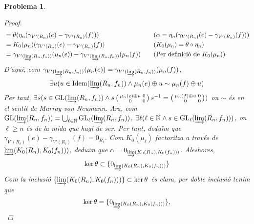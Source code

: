 \documentclass[compress]{article}
\newtheorem{problema}{Problema}
\theoremstyle{definition}
\DeclareMathOperator{\Idem}{Idem}
\DeclareMathOperator{\GL}{GL}
\begin{document}
\begin{problema}
\begin{enumerate}
\begin{proof}
\begin{align*}
                &=\theta(\eta_{n}(\gamma_{V'(R_{n})}(e)-\gamma_{V'(R_{n})}(f)))
                &\quad&\textrm{($\alpha=\eta_{n}(\gamma_{V'(R_{n})}(e)-\gamma_{V'(R_{n})}(f))$)}\\
                &=K_{0}(\mu_{n})(\gamma_{V'(R_{n})}(e)-\gamma_{V'(R_{n})}(f))
                &\quad&\textrm{($K_{0}(\mu_{n})=\theta\circ\eta_{n}$)}\\
                &=\gamma_{V'(\varinjlim(R_{n},f_{n}))}(\mu_{n}(e))-\gamma_{V'(\varinjlim(R_{n},f_{n}))}(\mu_{n}(f))
                &\quad&\textrm{(Per definició de $K_{0}(\mu_{n})$)}
            \end{align*}
            D'aquí, com $\gamma_{V'(\varinjlim(R_{n},f_{n}))}(\mu_{n}(e))=\gamma_{V'(\varinjlim(R_{n},f_{n}))}(\mu_{n}(f))$,
            \begin{equation*}
                \exists u(u\in\Idem(\varinjlim(R_{n},f_{n}))\land\mu_{n}(e)\oplus u\sim\mu_{n}(f)\oplus u)
            \end{equation*}
            Per tant, $\exists s(s\in\GL(\varinjlim(R_{n},f_{n}))\land s\left(\begin{smallmatrix}\mu_{n}(e)\oplus u&0\\
            0&0\end{smallmatrix}\right)s^{-1}=\left(\begin{smallmatrix}\mu_{n}(f)\oplus u&0\\
            0&0\end{smallmatrix}\right))$
            on $\sim$ és en el sentit de Murray-von Neumann. Ara, com $\GL(\varinjlim(R_{n},f_{n}))=\bigcup_{\ell\in\mathbb{N}}\GL_{\ell}(\varinjlim(R_{n},f_{n}))$, $\exists\ell(\ell\in\mathbb{N}\land s\in\GL_{\ell}(\varinjlim(R_{n},f_{n})))$, on $\ell\geq n$ és de la mida que hagi de ser. Per tant, deduïm que
            $\gamma_{V'(R_{\ell})}(e)-\gamma_{V'(R_{\ell})}(f)=0_{R_{\ell}}$.\newline
            Com $K_{0}(\mu_{\ell})$ factoritza a través de $\varinjlim(K_{0}(R_{n}),K_{0}(f_{n})))$, deduïm que $\alpha=0_{\varinjlim(K_{0}(R_{n}),K_{0}(f_{n})))}$. Aleshores,
            \begin{equation*}
                \ker{\theta}\subset\{0_{\varinjlim(K_{0}(R_{n}),K_{0}(f_{n})))}\}
            \end{equation*}
            Com la inclusió $\{\varinjlim(K_{0}(R_{n}),K_{0}(f_{n})))\}\subset\ker{\theta}$ és clara, per doble inclusió tenim que
            \begin{equation*}
                \ker{\theta}=\{0_{\varinjlim(K_{0}(R_{n}),K_{0}(f_{n})))}\},

\end{equation*}
\end{proof}
\end{enumerate}
\end{problema}
\end{document}

